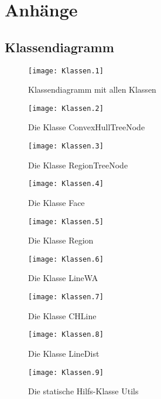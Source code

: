 \begin{appendix} \label{anhang}
\part*{Anhänge}
\adjustptc[-2]
\parttoc

   
 
 \chapter{Klassendiagramm}
 \begin{landscape}
 \begin{figure}	
	\texttt{[image: Klassen.1]}
	\caption{Klassendiagramm mit allen Klassen}
	\label{fig:UML_Klassendiagramm}
\end{figure}

 \begin{figure}	
	\texttt{[image: Klassen.2]}
	\caption{Die Klasse ConvexHullTreeNode}
	\label{fig:UML_CHTN}
\end{figure}

 \begin{figure}	
	\texttt{[image: Klassen.3]}
	\caption{Die Klasse RegionTreeNode}
	\label{fig:UML_RTN}
\end{figure}

 \begin{figure}	
	\texttt{[image: Klassen.4]}
	\caption{Die Klasse Face}
	\label{fig:UML_Face}
\end{figure}

 \begin{figure}	
	\texttt{[image: Klassen.5]}
	\caption{Die Klasse Region}
	\label{fig:UML_Region}
\end{figure}

 \begin{figure}	
	\texttt{[image: Klassen.6]}
	\caption{Die Klasse LineWA}
	\label{fig:UML_LineWA}
\end{figure}

 \begin{figure}	
	\texttt{[image: Klassen.7]}
	\caption{Die Klasse CHLine}
	\label{fig:UML_CHLine}
\end{figure}

 \begin{figure}	
	\texttt{[image: Klassen.8]}
	\caption{Die Klasse LineDist}
	\label{fig:UML_LineDist}
\end{figure}

\begin{figure}	
	\texttt{[image: Klassen.9]}
	\caption{Die statische Hilfs-Klasse Utils}
	\label{fig:UML_Utils}
\end{figure}


\end{landscape}
\end{appendix}
